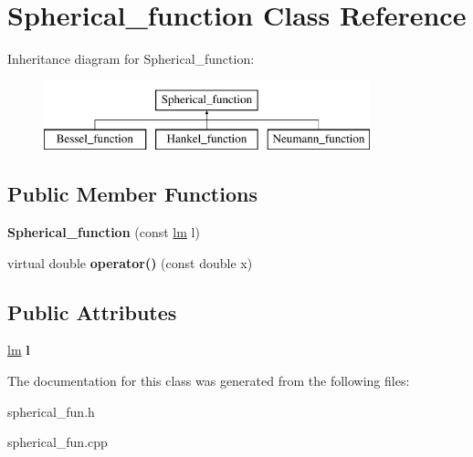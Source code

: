 \hypertarget{classSpherical__function}{}\section{Spherical\+\_\+function Class Reference}
\label{classSpherical__function}
Inheritance diagram for Spherical\+\_\+function\+:\begin{figure}[H]
\begin{center}
\leavevmode
\includegraphics[height=2.000000cm]{classSpherical__function}
\end{center}
\end{figure}
\subsection*{Public Member Functions}
\begin{DoxyCompactItemize}
\item 
\mbox{\label{classSpherical__function_a20241cd8f6ce288e384883cb750e86df}} 
{\bfseries Spherical\+\_\+function} (const \hyperlink{structlm}{lm} l)
\item 
\mbox{\label{classSpherical__function_a88dd031892e12980d8b65ed5d08b11dc}} 
virtual double {\bfseries operator()} (const double x)
\end{DoxyCompactItemize}
\subsection*{Public Attributes}
\begin{DoxyCompactItemize}
\item 
\mbox{\label{classSpherical__function_a099a8bef1ef1f19131168ee8230dbe55}} 
\hyperlink{structlm}{lm} {\bfseries l}
\end{DoxyCompactItemize}


The documentation for this class was generated from the following files\+:\begin{DoxyCompactItemize}
\item 
spherical\+\_\+fun.\+h\item 
spherical\+\_\+fun.\+cpp\end{DoxyCompactItemize}
